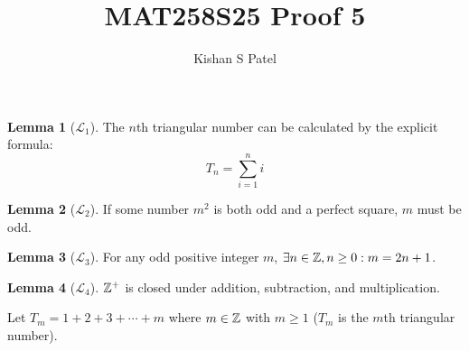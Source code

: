 \documentclass{exam}
\theoremstyle{plain}
\theoremstyle{definition}
\newtheorem{lemma}{Lemma}
\begin{document}
\title{MAT258S25 Proof 5}
\author{Kishan S Patel}
\maketitle

\renewcommand{\qedsymbol}{QED}


\begin{lemma}[$\mathcal L_1$]
	The $n$th triangular number can be calculated by the explicit formula:
	$$
		T_n = \sum_{i=1}^{n} i
	$$
\end{lemma}

\begin{lemma}[$\mathcal L_2$]
	If some number $m^2$ is both odd and a perfect square, $m$ must be odd.
\end{lemma}

\begin{lemma}[$\mathcal L_3$]
	For any odd positive integer $m$, $\exists n \in {\mathbb Z}, n\ge 0 : m=2n+1$.
\end{lemma}

\begin{lemma}[$\mathcal L_4$]
	${\mathbb Z}^{+}$ is closed under addition, subtraction, and multiplication.
\end{lemma}

Let $T_m=1+2+3+\cdots+m$ where $m \in {\mathbb Z}$  with $m \ge 1$ ($T_m$ is the $m$th triangular number).


\begin{questions}

	
	

\end{questions}
\end{document}
